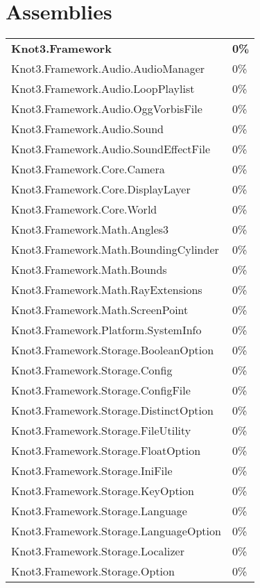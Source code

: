 \documentclass[a4paper,10pt]{article}
\begin{document}
\section{Assemblies}
\begin{longtable}[l]{ll}
\textbf{Knot3.Framework} & \textbf{0\%}\\
Knot3.Framework.Audio.AudioManager & 0\%\\
Knot3.Framework.Audio.LoopPlaylist & 0\%\\
Knot3.Framework.Audio.OggVorbisFile & 0\%\\
Knot3.Framework.Audio.Sound & 0\%\\
Knot3.Framework.Audio.SoundEffectFile & 0\%\\
Knot3.Framework.Core.Camera & 0\%\\
Knot3.Framework.Core.DisplayLayer & 0\%\\
Knot3.Framework.Core.World & 0\%\\
Knot3.Framework.Math.Angles3 & 0\%\\
Knot3.Framework.Math.BoundingCylinder & 0\%\\
Knot3.Framework.Math.Bounds & 0\%\\
Knot3.Framework.Math.RayExtensions & 0\%\\
Knot3.Framework.Math.ScreenPoint & 0\%\\
Knot3.Framework.Platform.SystemInfo & 0\%\\
Knot3.Framework.Storage.BooleanOption & 0\%\\
Knot3.Framework.Storage.Config & 0\%\\
Knot3.Framework.Storage.ConfigFile & 0\%\\
Knot3.Framework.Storage.DistinctOption & 0\%\\
Knot3.Framework.Storage.FileUtility & 0\%\\
Knot3.Framework.Storage.FloatOption & 0\%\\
Knot3.Framework.Storage.IniFile & 0\%\\
Knot3.Framework.Storage.KeyOption & 0\%\\
Knot3.Framework.Storage.Language & 0\%\\
Knot3.Framework.Storage.LanguageOption & 0\%\\
Knot3.Framework.Storage.Localizer & 0\%\\
Knot3.Framework.Storage.Option & 0\%\\
\end{longtable}
\end{document}
